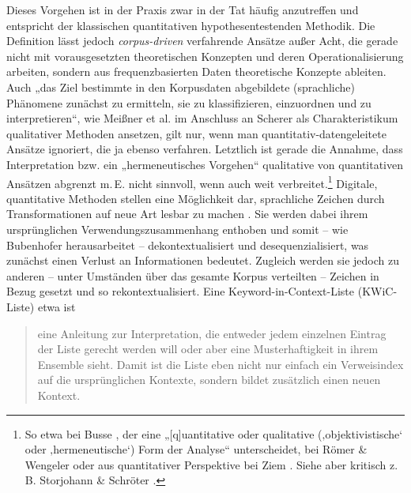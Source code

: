Dieses Vorgehen ist in der Praxis zwar in der Tat häufig anzutreffen und entspricht der klassischen quantitativen hypothesentestenden Methodik. Die Definition lässt jedoch \emph{corpus-driven} verfahrende Ansätze außer Acht, die gerade nicht mit vorausgesetzten theoretischen Konzepten und deren Operationalisierung arbeiten, sondern aus frequenzbasierten Daten theoretische Konzepte ableiten. Auch „das Ziel bestimmte in den Korpusdaten abgebildete (sprachliche) Phänomene zunächst zu ermitteln, sie zu klassifizieren, einzuordnen und zu interpretieren``, wie Meißner et al. \autocite*[312]{meissnerKorpusanalyse2016} im Anschluss an Scherer \autocite*{schererKorpuslinguistik2006} als Charakteristikum qualitativer Methoden ansetzen, gilt nur, wenn man quantitativ-datengeleitete Ansätze ignoriert, die ja ebenso verfahren. Letztlich ist gerade die Annahme, dass Interpretation bzw. ein „hermeneutisches Vorgehen`` \autocite[313]{meissnerKorpusanalyse2016} qualitative von quantitativen Ansätzen abgrenzt m.\,E. nicht sinnvoll, wenn auch weit verbreitet.\footnote{So etwa bei Busse \autocite*[202]{busse33LexikFrameanalytisch2017}, der eine „{[}q{]}uantitative oder qualitative (‚objektivistische` oder ‚hermeneutische`) Form der Analyse`` unterscheidet, bei Römer \& Wengeler \autocite*{roemerBackRootsVerteidigungsrede2022} oder aus quantitativer Perspektive bei Ziem \autocite*{ziem3WortschatzII2017}. Siehe aber kritisch z.\,B. Storjohann \& Schröter \autocite*[190-191]{storjohannPrasenzUndAbsenz2013}.} Digitale, quantitative Methoden stellen eine Möglichkeit dar, sprachliche Zeichen durch Transformationen auf neue Art lesbar zu machen \autocite{bubenhoferDigitaleKulturlinguistikDigitalitaet2022}. Sie werden dabei ihrem ursprünglichen Verwendungszusammenhang enthoben und somit -- wie Bubenhofer \autocite*{bubenhoferVisuelleLinguistikZur2020} herausarbeitet -- dekontextualisiert und desequenzialisiert, was zunächst einen Verlust an Informationen bedeutet. Zugleich werden sie jedoch zu anderen -- unter Umständen über das gesamte Korpus verteilten -- Zeichen in Bezug gesetzt und so rekontextualisiert. Eine Keyword-in-Context-Liste (KWiC-Liste) etwa ist

\begin{quote}
eine Anleitung zur Interpretation, die entweder jedem einzelnen Eintrag der Liste gerecht werden will oder aber eine Musterhaftigkeit in ihrem Ensemble sieht. Damit ist die Liste eben nicht nur einfach ein Verweisindex auf die ursprünglichen Kontexte, sondern bildet zusätzlich einen neuen Kontext. \autocite[195]{bubenhoferVisuelleLinguistikZur2020}
\end{quote}

